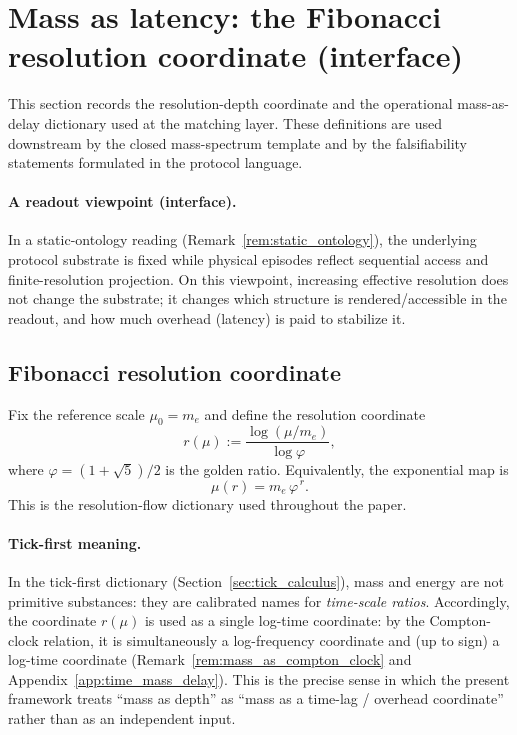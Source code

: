 \section{Mass as latency: the Fibonacci resolution coordinate (interface)}
\label{sec:mass_latency_coordinate}

This section records the resolution-depth coordinate and the operational mass-as-delay dictionary used at the matching layer.
These definitions are used downstream by the closed mass-spectrum template and by the falsifiability statements formulated in the protocol language.

\paragraph{A readout viewpoint (interface).}
In a static-ontology reading (Remark~\ref{rem:static_ontology}), the underlying protocol substrate is fixed while physical episodes reflect sequential access and finite-resolution projection.
On this viewpoint, increasing effective resolution does not change the substrate; it changes which structure is rendered/accessible in the readout, and how much overhead (latency) is paid to stabilize it.

\subsection{Fibonacci resolution coordinate}
\label{subsec:mass_resolution_coordinate}

Fix the reference scale $\mu_0=m_e$ and define the resolution coordinate
\begin{equation}\label{eq:r_of_mu_z128}
r(\mu):=\frac{\log(\mu/m_e)}{\log\varphi},
\end{equation}
where $\varphi=(1+\sqrt{5})/2$ is the golden ratio.
Equivalently, the exponential map is
\begin{equation}\label{eq:mu_of_r_z128}
\mu(r)=m_e\,\varphi^{\,r}.
\end{equation}
This is the resolution-flow dictionary used throughout the paper.

\paragraph{Tick-first meaning.}
In the tick-first dictionary (Section~\ref{sec:tick_calculus}), mass and energy are not primitive substances: they are calibrated names for \emph{time-scale ratios}.
Accordingly, the coordinate $r(\mu)$ is used as a single log-time coordinate: by the Compton-clock relation, it is simultaneously a log-frequency coordinate and (up to sign) a log-time coordinate (Remark~\ref{rem:mass_as_compton_clock} and Appendix~\ref{app:time_mass_delay}).
This is the precise sense in which the present framework treats ``mass as depth'' as ``mass as a time-lag / overhead coordinate'' rather than as an independent input.

